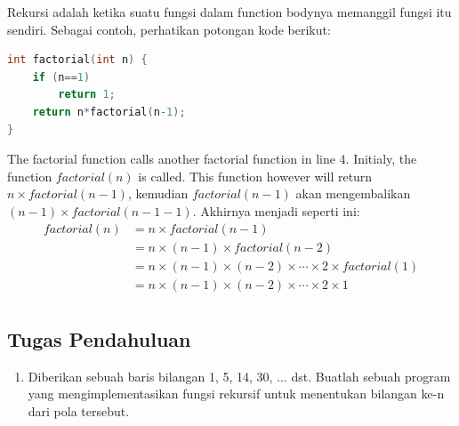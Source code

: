 Rekursi adalah ketika suatu fungsi dalam function bodynya memanggil fungsi itu sendiri.
Sebagai contoh, perhatikan potongan kode berikut:
\begin{lstlisting}[language=c,caption = Factorial dengan rekursi,label=lst:recursionexample01]
int factorial(int n) {
    if (n==1)
        return 1;
    return n*factorial(n-1);
}
\end{lstlisting}
The factorial function calls another factorial function in line 4.
Initialy, the function $factorial(n)$ is called. This function however will return 
$n\times factorial(n-1)$, kemudian $factorial(n-1)$ akan mengembalikan $(n-1)\times factorial(n-1-1)$.
Akhirnya menjadi seperti ini:
\begin{equation*}
    \begin{split}
        factorial(n)& = n \times factorial(n-1)\\
        & = n \times (n-1) \times factorial(n-2)\\
        & = n \times (n-1) \times (n-2) \times \cdots \times 2 \times factorial(1)\\
        & = n \times (n-1) \times (n-2) \times \cdots \times 2 \times 1\\
    \end{split}
\end{equation*}

\subsection{Tugas Pendahuluan}
\begin{enumerate}
   \item Diberikan sebuah baris bilangan 1, 5, 14, 30, ... dst. Buatlah sebuah program yang mengimplementasikan fungsi rekursif untuk menentukan bilangan ke-n dari pola tersebut.
\end{enumerate}